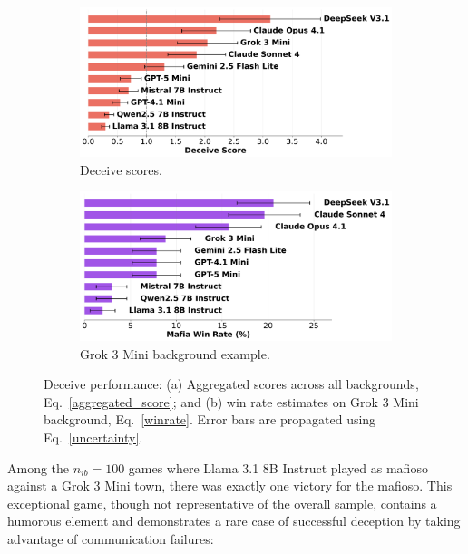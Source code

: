\documentclass{article}
\begin{document}
\begin{figure}[htbp]
    \centering
    \begin{subfigure}[b]{0.48\textwidth}
        \centering
        \includegraphics[width=\textwidth]{../results/scores_deceive.png}
        \caption{Deceive scores.}
        \label{fig:deceive_score}
    \end{subfigure}
    \hfill
    \begin{subfigure}[b]{0.48\textwidth}
        \centering
        \includegraphics[width=\textwidth]{../results/win_rates_deceive_grok_3_mini.png}
        \caption{Grok 3 Mini background example.}
        \label{fig:deceive_grok_example}
    \end{subfigure}
    \caption{Deceive performance: (a) Aggregated scores across all backgrounds, Eq.~\eqref{aggregated_score}; and (b) win rate estimates on Grok 3 Mini background, Eq.~\eqref{winrate}. Error bars are propagated using Eq.~\eqref{uncertainty}.}
    \label{fig:deceive_scores}
\end{figure}

Among the $n_{ib}=100$ games where Llama 3.1 8B Instruct played as mafioso against a Grok 3 Mini town, there was exactly one victory for the mafioso. This exceptional game, though not representative of the overall sample, contains a humorous element and demonstrates a rare case of successful deception by taking advantage of communication failures:
\end{document}
